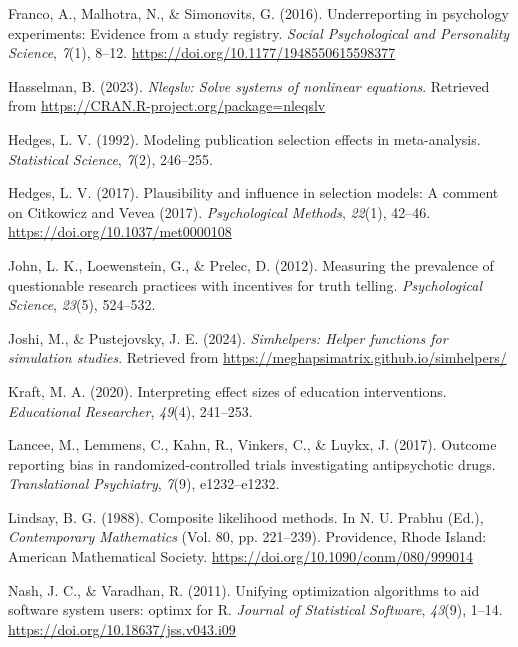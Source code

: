 \documentclass[
  american,
  man, donotrepeattitle,floatsintext]{apa7}
\newlength{\cslhangindent}
\newenvironment{CSLReferences}[2] %
 {\begin{list}{}{%
  \setlength{\itemindent}{0pt}
  \setlength{\leftmargin}{0pt}
  \setlength{\parsep}{0pt}
  \ifodd #1
   \setlength{\leftmargin}{\cslhangindent}
   \setlength{\itemindent}{-1\cslhangindent}
  \fi
  \setlength{\itemsep}{#2\baselineskip}}}
 {\end{list}}
\begin{document}
\begin{CSLReferences}{1}{0}
Franco, A., Malhotra, N., \& Simonovits, G. (2016). Underreporting in psychology experiments: Evidence from a study registry. \emph{Social Psychological and Personality Science}, \emph{7}(1), 8--12. \url{https://doi.org/10.1177/1948550615598377}

Hasselman, B. (2023). \emph{Nleqslv: Solve systems of nonlinear equations}. Retrieved from \url{https://CRAN.R-project.org/package=nleqslv}

Hedges, L. V. (1992). Modeling publication selection effects in meta-analysis. \emph{Statistical Science}, \emph{7}(2), 246--255.

Hedges, L. V. (2017). Plausibility and influence in selection models: {A} comment on {Citkowicz} and {Vevea} (2017). \emph{Psychological Methods}, \emph{22}(1), 42--46. \url{https://doi.org/10.1037/met0000108}

John, L. K., Loewenstein, G., \& Prelec, D. (2012). Measuring the prevalence of questionable research practices with incentives for truth telling. \emph{Psychological Science}, \emph{23}(5), 524--532.

Joshi, M., \& Pustejovsky, J. E. (2024). \emph{Simhelpers: Helper functions for simulation studies}. Retrieved from \url{https://meghapsimatrix.github.io/simhelpers/}

Kraft, M. A. (2020). Interpreting effect sizes of education interventions. \emph{Educational Researcher}, \emph{49}(4), 241--253.

Lancee, M., Lemmens, C., Kahn, R., Vinkers, C., \& Luykx, J. (2017). Outcome reporting bias in randomized-controlled trials investigating antipsychotic drugs. \emph{Translational Psychiatry}, \emph{7}(9), e1232--e1232.

Lindsay, B. G. (1988). Composite likelihood methods. In N. U. Prabhu (Ed.), \emph{Contemporary {Mathematics}} (Vol. 80, pp. 221--239). Providence, Rhode Island: American Mathematical Society. \url{https://doi.org/10.1090/conm/080/999014}

Nash, J. C., \& Varadhan, R. (2011). Unifying optimization algorithms to aid software system users: {optimx} for {R}. \emph{Journal of Statistical Software}, \emph{43}(9), 1--14. \url{https://doi.org/10.18637/jss.v043.i09}


\end{CSLReferences}
\end{document}

